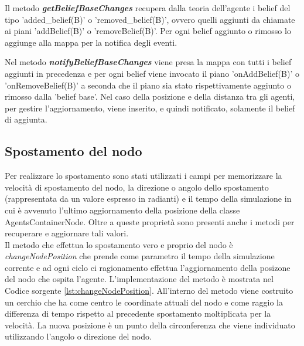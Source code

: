 \documentclass[12pt,a4paper,openright,twoside]{report}
\begin{document}
Il metodo \textbf{\textit{getBeliefBaseChanges}} recupera dalla teoria dell'agente i belief del tipo 'added\_belief(B)' o 'removed\_belief(B)', ovvero quelli aggiunti da chiamate ai piani 'addBelief(B)' o 'removeBelief(B)'. Per ogni belief aggiunto o rimosso lo aggiunge alla mappa per la notifica degli eventi.

Nel metodo \textbf{\textit{notifyBeliefBaseChanges}} viene presa la mappa con tutti i belief aggiunti in precedenza e per ogni belief viene invocato il piano 'onAddBelief(B)' o 'onRemoveBelief(B)' a seconda che il piano sia stato rispettivamente aggiunto o rimosso dalla 'belief base'. Nel caso della posizione e della distanza tra gli agenti, per gestire l'aggiornamento, viene inserito, e quindi notificato, solamente il belief di aggiunta.


\subsection{Spostamento del nodo}
Per realizzare lo spostamento sono stati utilizzati i campi per memorizzare la velocit\`a di spostamento del nodo, la direzione o angolo dello spostamento (rappresentata da un valore espresso in radianti) e il tempo della simulazione in cui \`e avvenuto l'ultimo aggiornamento della posizione della classe AgentsContainerNode.
Oltre a queste propriet\`a sono presenti anche i metodi per recuperare e aggiornare tali valori.
\\
Il metodo che effettua lo spostamento vero e proprio del nodo \`e \textit{changeNodePosition} che prende come parametro il tempo della simulazione corrente e ad ogni ciclo ci ragionamento effettua l'aggiornamento della posizone del nodo che ospita l'agente. L'implementazione del metodo \`e mostrata nel Codice sorgente \ref{lst:changeNodePosition}. All'interno del metodo viene costruito un cerchio che ha come centro le coordinate attuali del nodo e come raggio la differenza di tempo rispetto al precedente spostamento moltiplicata per la velocit\`a. La nuova posizione \`e un punto della circonferenza che viene individuato utilizzando l'angolo o direzione del nodo.
\medskip
{}
\end{document}
